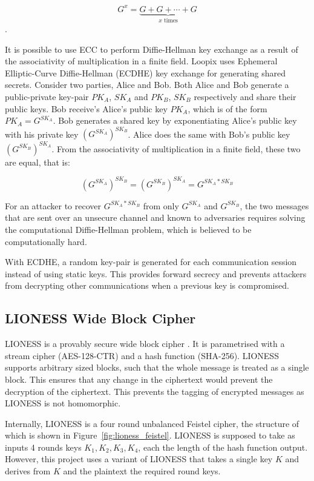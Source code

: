\documentclass[final,dissertation.tex]{subfiles}
\begin{document}
$$G^x = \underbrace{G + G + \cdots + G}_{x \text{ times}}$$.

It is possible to use ECC to perform Diffie-Hellman key exchange as a result of the associativity of multiplication in a finite field. Loopix uses Ephemeral Elliptic-Curve Diffie-Hellman (ECDHE) key exchange for generating shared secrets. Consider two parties, Alice and Bob. Both Alice and Bob generate a public-private key-pair $PK_A$, $SK_A$ and $PK_B$, $SK_B$ respectively and share their public keys. Bob receive's Alice's public key $PK_A$, which is of the form $PK_A = G^{SK_A}$. Bob generates a shared key by exponentiating Alice's public key with his private key $(G^{SK_A})^{SK_B}$. Alice does the same with Bob's public key $(G^{SK_B})^{SK_A}$. From the associativity of multiplication in a finite field, these two are equal, that is:

$$(G^{SK_A})^{SK_B} = (G^{SK_B})^{SK_A} = G^{SK_A*SK_B}$$

For an attacker to recover $G^{SK_A*SK_B}$ from only $G^{SK_A}$ and $G^{SK_B}$, the two messages that are sent over an unsecure channel and known to adversaries requires solving the computational Diffie-Hellman problem, which is believed to be computationally hard.

With ECDHE, a random key-pair is generated for each communication session instead of using static keys. This provides forward secrecy and prevents attackers from decrypting other communications when a previous key is compromised.

\subsection{LIONESS Wide Block Cipher}

LIONESS is a provably secure wide block cipher \cite{anderson1996two}. It is parametrised with a stream cipher (AES-128-CTR) and a hash function (SHA-256). LIONESS supports arbitrary sized blocks, such that the whole message is treated as a single block. This ensures that any change in the ciphertext would prevent the decryption of the ciphertext. This prevents the tagging of encrypted messages as LIONESS is not homomorphic.

Internally, LIONESS is a four round unbalanced Feistel cipher, the structure of which is shown in Figure~\ref{fig:lioness_feistel}. LIONESS is supposed to take as inputs 4 rounds keys $K_1, K_2, K_3, K_4$, each the length of the hash function output. However, this project uses a variant of LIONESS that takes a single key $K$ and derives from $K$ and the plaintext the required round keys.
\end{document}
